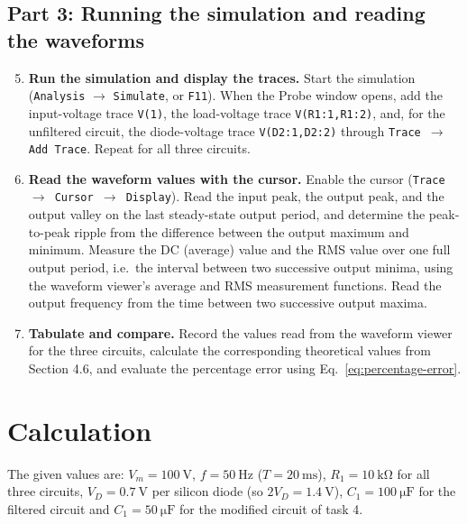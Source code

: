 \documentclass[12pt,a4paper]{article}
\begin{document}
	\subsection*{Part 3: Running the simulation and reading the waveforms}
	
	\begin{enumerate}[leftmargin=0.8cm,label=\textbf{Step \arabic*:},itemsep=0.55em]
		\setcounter{enumi}{4}
		\item \textbf{Run the simulation and display the traces.}
		Start the simulation (\texttt{Analysis} $\rightarrow$ \texttt{Simulate}, or \texttt{F11}). When the Probe window opens, add the input-voltage trace \texttt{V(1)}, the load-voltage trace \texttt{V(R1:1,R1:2)}, and, for the unfiltered circuit, the diode-voltage trace \texttt{V(D2:1,D2:2)} through \texttt{Trace $\rightarrow$ Add Trace}. Repeat for all three circuits.
		
		\item \textbf{Read the waveform values with the cursor.}
		Enable the cursor (\texttt{Trace $\rightarrow$ Cursor $\rightarrow$ Display}). Read the input peak, the output peak, and the output valley on the last steady-state output period, and determine the peak-to-peak ripple from the difference between the output maximum and minimum. Measure the DC (average) value and the RMS value over one full output period, i.e.\ the interval between two successive output minima, using the waveform viewer's average and RMS measurement functions. Read the output frequency from the time between two successive output maxima.
		
		\item \textbf{Tabulate and compare.}
		Record the values read from the waveform viewer for the three circuits, calculate the corresponding theoretical values from Section 4.6, and evaluate the percentage error using Eq.~\eqref{eq:percentage-error}.
	\end{enumerate}
	
	\section{Calculation}
	The given values are: $V_m = \SI{100}{\volt}$, $f = \SI{50}{\hertz}$ ($T = \SI{20}{\milli\second}$), $R_1 = \SI{10}{\kilo\ohm}$ for all three circuits, $V_D = \SI{0.7}{\volt}$ per silicon diode (so $2V_D = \SI{1.4}{\volt}$), $C_1 = \SI{100}{\micro\farad}$ for the filtered circuit and $C_1 = \SI{50}{\micro\farad}$ for the modified circuit of task 4.
	
\end{document}

